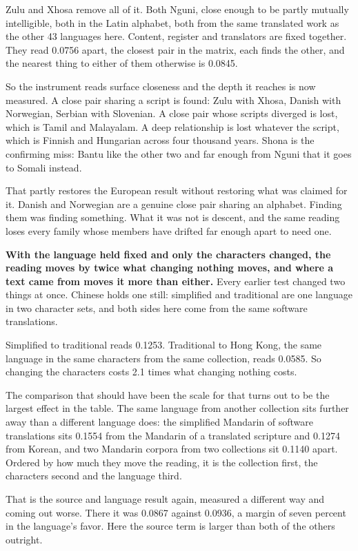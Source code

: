 Zulu and Xhosa remove all of it. Both Nguni, close enough to be partly mutually intelligible, both in the Latin alphabet, both from the same translated work as the other 43 languages here. Content, register and translators are fixed together. They read 0.0756 apart, the closest pair in the matrix, each finds the other, and the nearest thing to either of them otherwise is 0.0845.

So the instrument reads surface closeness and the depth it reaches is now measured. A close pair sharing a script is found: Zulu with Xhosa, Danish with Norwegian, Serbian with Slovenian. A close pair whose scripts diverged is lost, which is Tamil and Malayalam. A deep relationship is lost whatever the script, which is Finnish and Hungarian across four thousand years. Shona is the confirming miss: Bantu like the other two and far enough from Nguni that it goes to Somali instead.

That partly restores the European result without restoring what was claimed for it. Danish and Norwegian are a genuine close pair sharing an alphabet. Finding them was finding something. What it was not is descent, and the same reading loses every family whose members have drifted far enough apart to need one.

\textbf{With the language held fixed and only the characters changed, the reading moves by twice what changing nothing moves, and where a text came from moves it more than either.} Every earlier test changed two things at once. Chinese holds one still: simplified and traditional are one language in two character sets, and both sides here come from the same software translations.

Simplified to traditional reads 0.1253. Traditional to Hong Kong, the same language in the same characters from the same collection, reads 0.0585. So changing the characters costs 2.1 times what changing nothing costs.

The comparison that should have been the scale for that turns out to be the largest effect in the table. The same language from another collection sits further away than a different language does: the simplified Mandarin of software translations sits 0.1554 from the Mandarin of a translated scripture and 0.1274 from Korean, and two Mandarin corpora from two collections sit 0.1140 apart. Ordered by how much they move the reading, it is the collection first, the characters second and the language third.

That is the source and language result again, measured a different way and coming out worse. There it was 0.0867 against 0.0936, a margin of seven percent in the language's favor. Here the source term is larger than both of the others outright.

